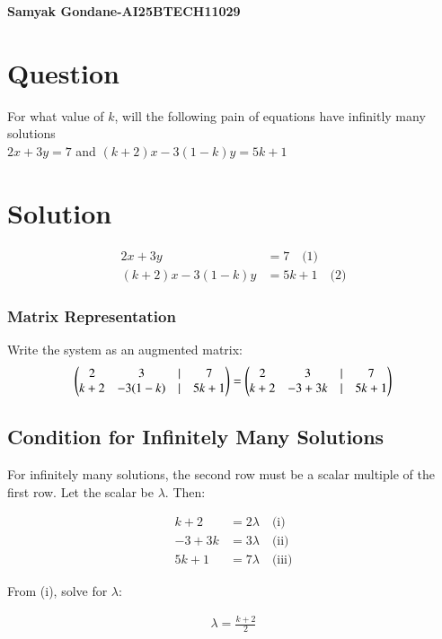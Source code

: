 \documentclass{article}
\begin{document}
\begin{center}
\large
    \textbf{Samyak Gondane-AI25BTECH11029}
\end{center}
\date{}

\section*{Question}
For what value of $k$, will the following pain of equations have infinitly many solutions\\

$2x + 3y = 7$ and $(k + 2)x - 3(1 - k)y = 5k + 1$

\section*{Solution}

\begin{align}
2x + 3y &= 7 \quad \text{(1)} \\
(k + 2)x - 3(1 - k)y &= 5k + 1 \quad \text{(2)}
\end{align}



\subsubsection*{Matrix Representation}
Write the system as an augmented matrix:
\begin{align}
\begin{pmatrix}
2 & 3 & \vert &7 \\
k+2 & -3(1-k) & \vert &5k + 1
\end{pmatrix} 
= 
\begin{pmatrix}
2 & 3 & \vert &7 \\
k+2 & -3 + 3k & \vert & 5k + 1
\end{pmatrix}
\end{align}


\subsection*{Condition for Infinitely Many Solutions}
For infinitely many solutions, the second row must be a scalar multiple of the first row. Let the scalar be $\lambda$. Then:

\begin{align}
k + 2 &= 2\lambda \quad \text{(i)} \\
-3 + 3k &= 3\lambda \quad \text{(ii)} \\
5k + 1 &= 7\lambda \quad \text{(iii)}
\end{align}

From (i), solve for $\lambda$:

\begin{align}
\lambda = \frac{k + 2}{2}
\end{align}
\end{document}
